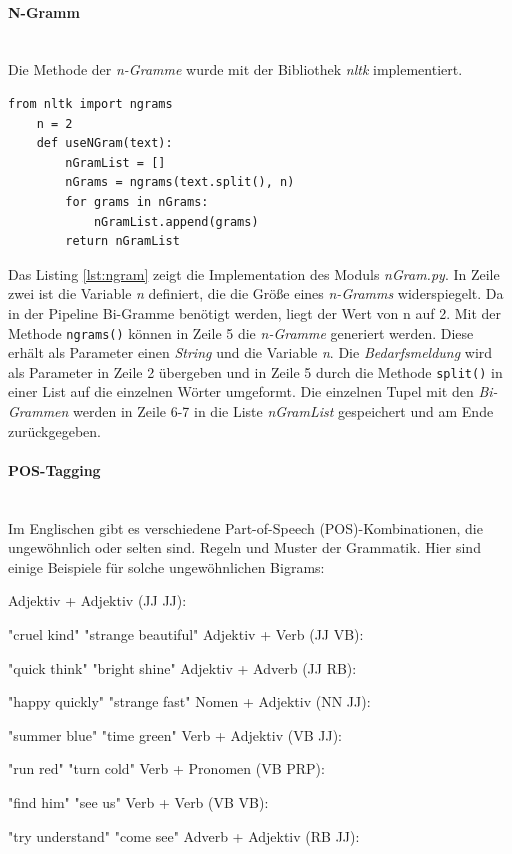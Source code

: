 \paragraph{N-Gramm}\mbox{}\\
Die Methode der \emph{n-Gramme} wurde mit der Bibliothek \emph{nltk} implementiert.
\begin{lstlisting}[caption={Implementation des Moduls \emph{nGram.py}}, label=lst:ngram]
	from nltk import ngrams
	n = 2
	def useNGram(text):
		nGramList = []
		nGrams = ngrams(text.split(), n)
		for grams in nGrams:
			nGramList.append(grams)
		return nGramList
\end{lstlisting}
Das Listing \ref{lst:ngram} zeigt die Implementation des Moduls \emph{nGram.py}. In Zeile zwei ist die Variable \emph{n} definiert, die die Größe eines \emph{n-Gramms} widerspiegelt. Da in der Pipeline Bi-Gramme benötigt werden, liegt der Wert von n auf 2. Mit der Methode \lstinline{ngrams()}
können in Zeile 5 die \emph{n-Gramme} generiert werden. Diese erhält als Parameter einen \emph{String} und die Variable \emph{n}. Die \emph{Bedarfsmeldung} wird als Parameter in Zeile 2 übergeben und in Zeile 5 durch die Methode \lstinline{split()}
in einer List auf die einzelnen Wörter umgeformt. Die einzelnen Tupel mit den \emph{Bi-Grammen} werden in Zeile 6-7 in die Liste \emph{nGramList} gespeichert und am Ende zurückgegeben.
\paragraph{POS-Tagging}\mbox{}\\
Im Englischen gibt es verschiedene Part-of-Speech (POS)-Kombinationen, die ungewöhnlich oder selten sind. Regeln und Muster der Grammatik. Hier sind einige Beispiele für solche ungewöhnlichen Bigrams:

Adjektiv + Adjektiv (JJ JJ):

"cruel kind"
"strange beautiful"
Adjektiv + Verb (JJ VB):

"quick think"
"bright shine"
Adjektiv + Adverb (JJ RB):

"happy quickly"
"strange fast"
Nomen + Adjektiv (NN JJ):

"summer blue"
"time green"
Verb + Adjektiv (VB JJ):

"run red"
"turn cold"
Verb + Pronomen (VB PRP):

"find him"
"see us"
Verb + Verb (VB VB):

"try understand"
"come see"
Adverb + Adjektiv (RB JJ):

